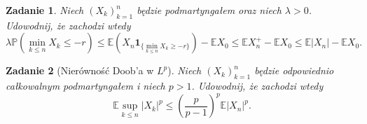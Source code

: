 \documentclass{mwart}
\newtheorem{zd}{Zadanie}
\begin{document}
\begin{zd}
Niech $(X_k)_{k=1}^n$ będzie podmartyngałem oraz niech $\lambda > 0$. Udowodnij, że zachodzi wtedy
\begin{displaymath}
\lambda \mathbb{P}(\min_{k\leq n}X_k \leq -r) \leq \mathbb{E}(X_n\pmb{1}_{\{\min_{k\leq n}X_k \geq -r\}}) - \mathbb{E}X_0 \leq \mathbb{E}X_n^+ - \mathbb{E}X_0 \leq \mathbb{E}|X_n| - \mathbb{E}X_0.
\end{displaymath}
\end{zd}

\begin{zd}[Nierówność Doob'a w $L^p$]
Niech $(X_k)_{k=1}^n$ będzie odpowiednio całkowalnym podmartyngałem i niech $p > 1$. Udowodnij, że zachodzi wtedy
\begin{displaymath}
\mathbb{E}\sup_{k\leq n}|X_k|^p \leq \left(\frac{p}{p-1}\right)^p\mathbb{E}|X_n|^p.
\end{displaymath}
\end{zd}
\end{document}
